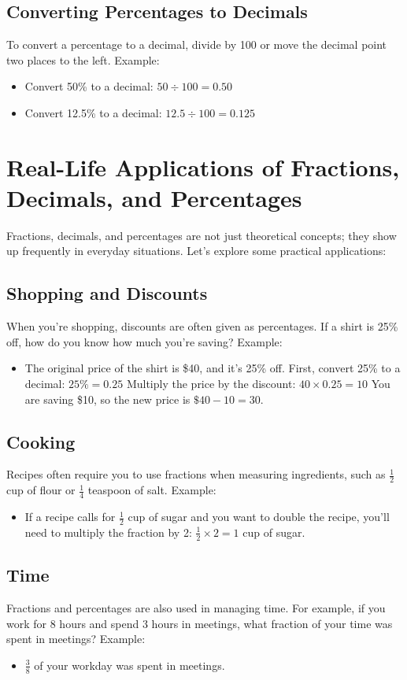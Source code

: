 \subsection{Converting Percentages to Decimals}
To convert a percentage to a decimal, divide by 100 or move the decimal point two places to the left. Example:
\begin{itemize}
    \item Convert 50\% to a decimal: $50 \div 100 = 0.50$
    \item Convert 12.5\% to a decimal: $12.5 \div 100 = 0.125$
\end{itemize}

\section{Real-Life Applications of Fractions, Decimals, and Percentages}
Fractions, decimals, and percentages are not just theoretical concepts; they show up frequently in everyday situations. Let’s explore some practical applications:

\subsection{Shopping and Discounts}
When you're shopping, discounts are often given as percentages. If a shirt is 25\% off, how do you know how much you're saving? Example:
\begin{itemize}
    \item The original price of the shirt is \$40, and it’s 25\% off. First, convert 25\% to a decimal: $25\% = 0.25$ Multiply the price by the discount: $40 \times 0.25 = 10$ You are saving \$10, so the new price is $\$40 - 10 = 30$.
\end{itemize}

\subsection{Cooking}
Recipes often require you to use fractions when measuring ingredients, such as $\frac{1}{2}$ cup of flour or $\frac{1}{4}$ teaspoon of salt. Example:
\begin{itemize}
    \item If a recipe calls for $\frac{1}{2}$ cup of sugar and you want to double the recipe, you’ll need to multiply the fraction by 2: $\frac{1}{2} \times 2 = 1$ cup of sugar.
\end{itemize}

\subsection{Time}
Fractions and percentages are also used in managing time. For example, if you work for 8 hours and spend 3 hours in meetings, what fraction of your time was spent in meetings? Example:
\begin{itemize}
    \item $\frac{3}{8}$ of your workday was spent in meetings.
\end{itemize}

